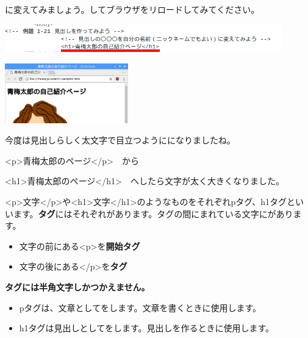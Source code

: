 に変えてみましょう。してブラウザをリロードしてみてください。


\bigskip

\includegraphics[width=0.9\textwidth]{text01-img/textbook-img157.png}


\bigskip


\bigskip

\includegraphics[width=0.4\textwidth]{text01-img/textbook-img156.png}


今度は見出しらしく太文字で目立つようにになりましたね。




\bigskip

{\textless}p{\textgreater}青梅太郎のページ{\textless}/p{\textgreater}　から

{\textless}h1{\textgreater}青梅太郎のページ{\textless}/h1{\textgreater}　へしたら文字が太く大きくなりました。


\bigskip

{\textless}p{\textgreater}文字{\textless}/p{\textgreater}や{\textless}h1{\textgreater}文字{\textless}/h1{\textgreater}のようなものをそれぞれpタグ、h1タグといいます。\textbf{タグ}にはそれぞれがあります。タグの間にまれている文字にがあります。

\begin{itemize}
  \item 文字の前にある{\textless}p{\textgreater}を\textbf{開始タグ}
  \item 文字の後にある{\textless}/p{\textgreater}を\textbf{タグ}
\end{itemize}

\textbf{タグには半角文字しかつかえません。}

\begin{itemize}
  \item pタグは、文章としてをします。文章を書くときに使用します。

  \item h1タグは見出しとしてをします。見出しを作るときに使用します。
\end{itemize}


